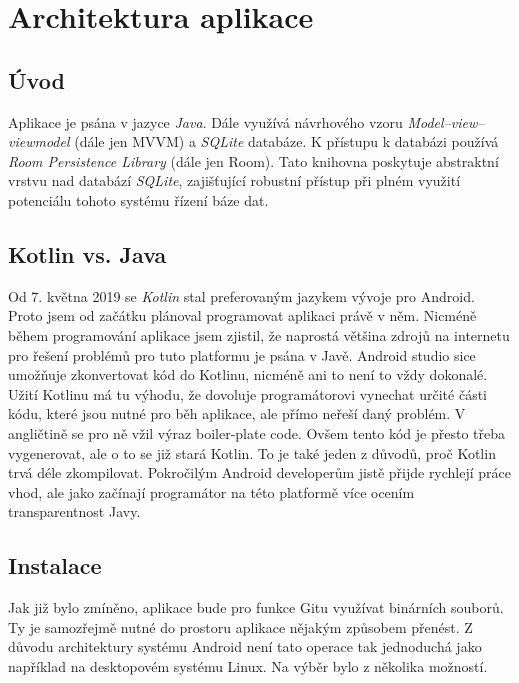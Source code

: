     \section{Architektura aplikace}

        \subsection{Úvod}
        Aplikace je psána v jazyce \emph{Java}. Dále využívá návrhového vzoru \emph{Model–view–viewmodel} (dále jen MVVM) a \emph{SQLite} databáze. K přístupu k databázi používá \emph{Room Persistence Library} (dále jen Room). Tato knihovna poskytuje abstraktní vrstvu nad databází \emph{SQLite}, zajišťující robustní přístup při plném využití potenciálu tohoto systému řízení báze dat.

        \subsection{Kotlin vs. Java}
        Od 7. května 2019 se \emph{Kotlin} stal preferovaným jazykem vývoje pro Android. Proto jsem od začátku plánoval programovat aplikaci právě v něm. Nicméně během programování aplikace jsem zjistil, že naprostá většina zdrojů na internetu pro řešení problémů pro tuto platformu je psána v Javě. Android studio sice umožňuje zkonvertovat kód do Kotlinu, nicméně ani to není to vždy dokonalé. Užití Kotlinu má tu výhodu, že dovoluje programátorovi vynechat určité části kódu, které jsou nutné pro běh aplikace, ale přímo neřeší daný problém. V angličtině se pro ně vžil výraz boiler-plate code. Ovšem tento kód je přesto třeba vygenerovat, ale o to se již stará Kotlin. To je také jeden z důvodů, proč Kotlin trvá déle zkompilovat. Pokročilým Android developerům jistě přijde rychlejí práce vhod, ale jako začínají programátor na této platformě více ocením transparentnost Javy.

        \subsection{Instalace}
        Jak již bylo zmíněno, aplikace bude pro funkce Gitu využívat binárních souborů. Ty je samozřejmě nutné do prostoru aplikace nějakým způsobem přenést. Z důvodu architektury systému Android není tato operace tak jednoduchá jako například na desktopovém systému Linux. Na výběr bylo z několika možností.

